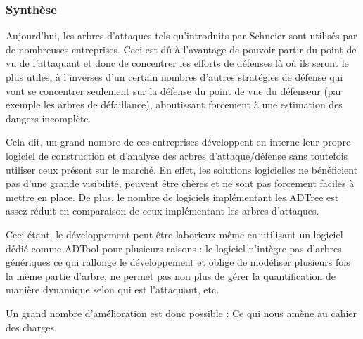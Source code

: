         \subsubsection{Synthèse}
            Aujourd'hui, les arbres d'attaques tels qu'introduits par Schneier sont utilisés par de nombreuses entreprises. Ceci est dû à l'avantage de pouvoir partir du point de vu de l'attaquant et donc de concentrer les efforts de défenses là où ils seront le plus utiles, à l'inverses d'un certain nombres d'autres stratégies de défense qui vont se concentrer seulement sur la défense du point de vue du défenseur (par exemple les arbres de défaillance), aboutissant forcement à une estimation des dangers incomplète. 

            Cela dit, un grand nombre de ces entreprises développent en interne leur propre logiciel de construction et d'analyse des arbres d'attaque/défense sans toutefois utiliser ceux présent sur le marché. En effet, les solutions logicielles ne bénéficient pas d'une grande visibilité, peuvent être chères et ne sont pas forcement faciles à mettre en place. De plus, le nombre de logiciels implémentant les ADTree est assez réduit en comparaison de ceux implémentant les arbres d'attaques. 

            Ceci étant, le développement peut être laborieux même en utilisant un logiciel dédié comme ADTool pour plusieurs raisons : le logiciel n’intègre pas d'arbres génériques ce qui rallonge le développement et oblige de modéliser plusieurs fois la même partie d'arbre, ne permet pas non plus de gérer la quantification de manière dynamique selon qui est l'attaquant, etc.

            Un grand nombre d'amélioration est donc possible : Ce qui nous amène au cahier des charges.